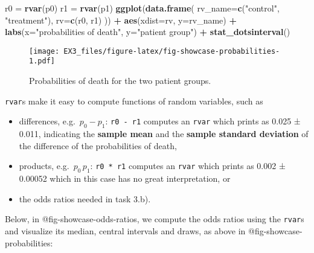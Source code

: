\documentclass[
]{article}
\newenvironment{Shaded}{\begin{snugshade}}{\end{snugshade}}
\newcommand{\AttributeTok}[1]{\textcolor[rgb]{0.13,0.29,0.53}{#1}}
\newcommand{\FunctionTok}[1]{\textcolor[rgb]{0.13,0.29,0.53}{\textbf{#1}}}
\newcommand{\NormalTok}[1]{#1}
\newcommand{\OtherTok}[1]{\textcolor[rgb]{0.56,0.35,0.01}{#1}}
\newcommand{\SpecialCharTok}[1]{\textcolor[rgb]{0.81,0.36,0.00}{\textbf{#1}}}
\newcommand{\StringTok}[1]{\textcolor[rgb]{0.31,0.60,0.02}{#1}}
\providecommand{\tightlist}{%
  \setlength{\itemsep}{0pt}\setlength{\parskip}{0pt}}
\begin{document}
\begin{Shaded}
\begin{Highlighting}[]
\NormalTok{r0 }\OtherTok{=} \FunctionTok{rvar}\NormalTok{(p0)}
\NormalTok{r1 }\OtherTok{=} \FunctionTok{rvar}\NormalTok{(p1)}
\FunctionTok{ggplot}\NormalTok{(}\FunctionTok{data.frame}\NormalTok{(}
    \AttributeTok{rv\_name=}\FunctionTok{c}\NormalTok{(}\StringTok{"control"}\NormalTok{, }\StringTok{"treatment"}\NormalTok{), }\AttributeTok{rv=}\FunctionTok{c}\NormalTok{(r0, r1)}
\NormalTok{)) }\SpecialCharTok{+}
    \FunctionTok{aes}\NormalTok{(}\AttributeTok{xdist=}\NormalTok{rv, }\AttributeTok{y=}\NormalTok{rv\_name) }\SpecialCharTok{+} 
    \FunctionTok{labs}\NormalTok{(}\AttributeTok{x=}\StringTok{"probabilities of death"}\NormalTok{, }\AttributeTok{y=}\StringTok{"patient group"}\NormalTok{) }\SpecialCharTok{+} 
    \FunctionTok{stat\_dotsinterval}\NormalTok{()}
\end{Highlighting}
\end{Shaded}

\begin{figure}
\centering
\texttt{[image: EX3\_files/figure-latex/fig-showcase-probabilities-1.pdf]}
\caption{Probabilities of death for the two patient groups.}
\end{figure}

\texttt{rvar}s make it easy to compute functions of random variables,
such as

\begin{itemize}
\tightlist
\item
  differences, e.g.~\(p_0 - p_1\): \texttt{r0\ -\ r1} computes an
  \texttt{rvar} which prints as 0.025 ± 0.011, indicating the
  \textbf{sample mean} and the \textbf{sample standard deviation} of the
  difference of the probabilities of death,
\item
  products, e.g.~\(p_0 \, p_1\): \texttt{r0\ *\ r1} computes an
  \texttt{rvar} which prints as 0.002 ± 0.00052 which in this case has
  no great interpretation, or
\item
  the odds ratios needed in task 3.b).
\end{itemize}

Below, in @fig-showcase-odds-ratios, we compute the odds ratios using
the \texttt{rvar}s and visualize its median, central intervals and
draws, as above in @fig-showcase-probabilities:
\end{document}
